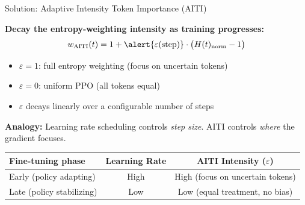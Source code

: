 \documentclass[aspectratio=169,10pt]{beamer}
\begin{document}
\begin{frame}{Solution: Adaptive Intensity Token Importance (AITI)}

\textbf{Decay the entropy-weighting intensity as training progresses:}
\[
w_{\text{AITI}}(t) = 1 + \alert{\varepsilon(\text{step})} \cdot \bigl(H(t)_{\text{norm}} - 1\bigr)
\]

\begin{itemize}
    \item $\varepsilon = 1$: full entropy weighting (focus on uncertain tokens)
    \item $\varepsilon = 0$: uniform PPO (all tokens equal)
    \item $\varepsilon$ decays linearly over a configurable number of steps
\end{itemize}

\vspace{0.3cm}
\textbf{Analogy:} Learning rate scheduling controls \textit{step size}. AITI controls \textit{where} the gradient focuses.

\begin{table}
\small
\begin{tabular}{lcc}
\toprule
Fine-tuning phase & Learning Rate & AITI Intensity ($\varepsilon$) \\
\midrule
Early (policy adapting) & High & High (focus on uncertain tokens) \\
Late (policy stabilizing) & Low & Low (equal treatment, no bias) \\
\bottomrule
\end{tabular}
\end{table}

\end{frame}
\end{document}
